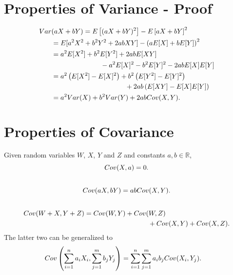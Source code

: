\documentclass[letterpaper,10pt,english]{sphinxmanual}
\begin{document}
\section{Properties of Variance - Proof}
\label{probability:properties-of-variance-proof}\begin{gather}
\begin{split}Var&(aX+bY) = E\left[(aX+bY)^2\right] - E\left[aX+bY\right]^2 \\
& = E[a^2X^2 + b^2Y^2 + 2abXY] -
\left(aE[X]+bE[Y]\right)^2 \\
& = a^2 E[X^2] + b^2 E[Y^2] + 2abE[XY] \\
& \hspace{1in} - a^2E[X]^2 - b^2E[Y]^2 -2abE[X]E[Y] \\
& = a^2 \left(E[X^2] - E[X]^2\right) + b^2
\left(E[Y^2] - E[Y]^2\right) \\
& \hspace{1.5in} + 2ab \left(E[XY] - E[X]E[Y]\right) \\
& = a^2Var(X) + b^2Var(Y) + 2abCov(X,Y).\end{split}\notag
\end{gather}

\section{Properties of Covariance}
\label{probability:properties-of-covariance}
Given random variables $W$, $X$, $Y$ and $Z$
and constants $a,b \in \mathbb{R}$,
\begin{gather}
\begin{split}Cov(X,a) = 0.\end{split}\notag\\\begin{split}\end{split}\notag
\end{gather}\begin{gather}
\begin{split}Cov(aX,bY) = abCov(X,Y).\end{split}\notag\\\begin{split}\end{split}\notag
\end{gather}\begin{gather}
\begin{split}Cov(W+X,Y+Z) & = Cov(W,Y) + Cov(W,Z) \\
& \hspace{1.3in}+ Cov(X,Y) + Cov(X,Z).\end{split}\notag
\end{gather}
The latter two can be generalized to
\begin{gather}
\begin{split}Cov\left(\sum_{i=1}^n a_i X_i, \sum_{j=1}^m b_j Y_j\right) & =
\sum_{i=1}^n \sum_{j=1}^m a_i b_j Cov(X_i, Y_j).\end{split}\notag
\end{gather}
\end{document}
